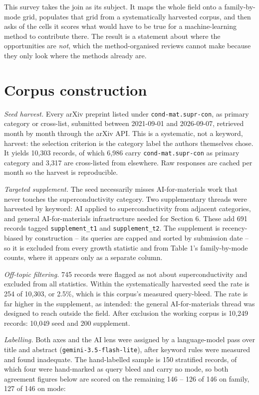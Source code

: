 \documentclass[
  11pt,
]{article}
\begin{document}
This survey takes the join as its subject. It maps the whole field onto
a family-by-mode grid, populates that grid from a systematically
harvested corpus, and then asks of the cells it scores what would have
to be true for a machine-learning method to contribute there. The result
is a statement about where the opportunities are \emph{not}, which the
method-organised reviews cannot make because they only look where the
methods already are.

\section{Corpus construction}\label{corpus-construction}

\emph{Seed harvest.} Every arXiv preprint listed under
\texttt{cond-mat.supr-con}, as primary category or cross-list, submitted
between 2021-09-01 and 2026-09-07, retrieved month by month through the
arXiv API. This is a systematic, not a keyword, harvest: the selection
criterion is the category label the authors themselves chose. It yields
10,303 records, of which 6,986 carry \texttt{cond-mat.supr-con} as
primary category and 3,317 are cross-listed from elsewhere. Raw
responses are cached per month so the harvest is reproducible.

\emph{Targeted supplement.} The seed necessarily misses AI-for-materials
work that never touches the superconductivity category. Two
supplementary threads were harvested by keyword: AI applied to
superconductivity from adjacent categories, and general AI-for-materials
infrastructure needed for Section 6. These add 691 records tagged
\texttt{supplement\_t1} and \texttt{supplement\_t2}. The supplement is
recency-biased by construction -- its queries are capped and sorted by
submission date -- so it is excluded from every growth statistic and
from Table 1's family-by-mode counts, where it appears only as a
separate column.

\emph{Off-topic filtering.} 745 records were flagged as not about
superconductivity and excluded from all statistics. Within the
systematically harvested seed the rate is 254 of 10,303, or 2.5\%, which
is this corpus's measured query-bleed. The rate is far higher in the
supplement, as intended: the general AI-for-materials thread was
designed to reach outside the field. After exclusion the working corpus
is 10,249 records: 10,049 seed and 200 supplement.

\emph{Labelling.} Both axes and the AI lens were assigned by a
language-model pass over title and abstract
(\texttt{gemini-3.5-flash-lite}), after keyword rules were measured and
found inadequate. The hand-labelled sample is 150 stratified records, of
which four were hand-marked as query bleed and carry no mode, so both
agreement figures below are scored on the remaining 146 -- 126 of 146 on
family, 127 of 146 on mode:
\end{document}
